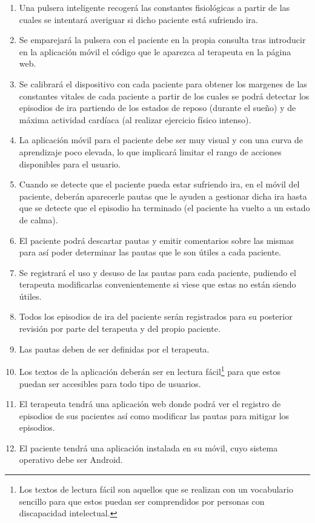 \begin{enumerate}
    \item Una pulsera inteligente recogerá las constantes fisiológicas a partir de las cuales se intentará averiguar si dicho paciente está sufriendo ira.
    \item Se emparejará la pulsera con el paciente en la propia consulta tras introducir en la aplicación móvil el código que le aparezca al terapeuta en la página web.
    \item Se calibrará el dispositivo con cada paciente para obtener los margenes de las constantes vitales de cada paciente a partir de los cuales se podrá detectar los episodios de ira partiendo de los estados de reposo (durante el sueño) y de máxima actividad cardíaca (al realizar ejercicio físico intenso).
    \item La aplicación móvil para el paciente debe ser muy visual y con una curva de aprendizaje poco elevada, lo que implicará limitar el rango de acciones disponibles para el usuario.
    \item Cuando se detecte que el paciente pueda estar sufriendo ira, en el móvil del paciente, deberán aparecerle pautas que le ayuden a gestionar dicha ira hasta que se detecte que el episodio ha terminado (el paciente ha vuelto a un estado de calma).
    \item El paciente podrá descartar pautas y emitir comentarios sobre las mismas para así poder determinar las pautas que le son útiles a cada paciente.
    \item Se registrará el uso y desuso de las pautas para cada paciente, pudiendo el terapeuta modificarlas convenientemente si viese que estas no están siendo útiles.
    \item Todos los episodios de ira del paciente serán registrados para su posterior revisión por parte del terapeuta y del propio paciente.
    \item Las pautas deben de ser definidas por el terapeuta.
    \item Los textos de la aplicación deberán ser en lectura fácil\footnote{Los textos de lectura fácil son aquellos que se realizan con un vocabulario sencillo para que estos puedan ser comprendidos por personas con discapacidad intelectual.} para que estos puedan ser accesibles para todo tipo de usuarios.
    \item El terapeuta tendrá una aplicación web donde podrá ver el registro de episodios de sus pacientes así como modificar las pautas para mitigar los episodios.
    \item El paciente tendrá una aplicación instalada en su móvil, cuyo sistema operativo debe ser Android.
\end{enumerate}


